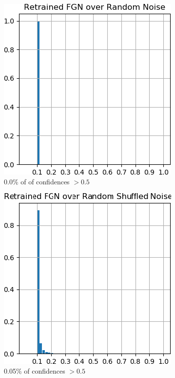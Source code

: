 \documentclass[12pt,oneside]{CUNY_PhD}
\begin{document}
\begin{figure}[!htbp]
    \centering
    \begin{subfigure}[t]{0.49\textwidth}
        \includegraphics[width=\textwidth]{images/mnist-behavior/retrained-hist-random.png}
        \caption*{0.0\% of of confidences $>0.5$}
    \end{subfigure}
    \begin{subfigure}[t]{0.49\textwidth}
        \includegraphics[width=\textwidth]{images/mnist-behavior/retrained-hist-shuffled-fixed.png}
        \caption*{0.05\% of confidences $>0.5$}
    \end{subfigure}
    \caption{}
    \label{fig:ret-hist}
\end{figure}\\
\end{document}
